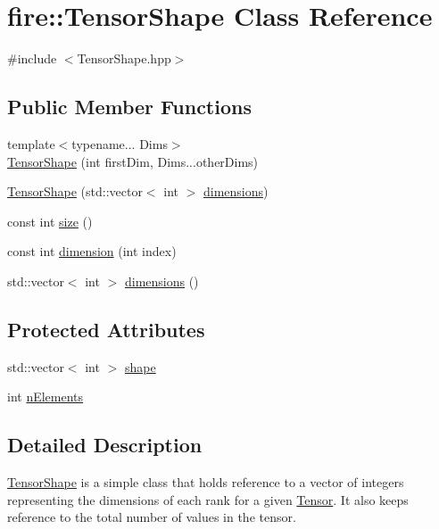 \hypertarget{a00048}{}\section{fire\+:\+:Tensor\+Shape Class Reference}
\label{a00048}


{\ttfamily \#include $<$Tensor\+Shape.\+hpp$>$}

\subsection*{Public Member Functions}
\begin{DoxyCompactItemize}
\item 
{\footnotesize template$<$typename... Dims$>$ }\\\hyperlink{a00048_a899618b4ea57612bd7fa8a7cdf73d66b}{Tensor\+Shape} (int first\+Dim, Dims...\+other\+Dims)
\item 
\hyperlink{a00048_a0c071ec9da07a6f364f063eb8e2c292f}{Tensor\+Shape} (std\+::vector$<$ int $>$ \hyperlink{a00048_aedcad29b08b96c413686f834df1faca9}{dimensions})
\item 
const int \hyperlink{a00048_a75b374e1e1b1a0f266916d8df69e99ec}{size} ()
\item 
const int \hyperlink{a00048_a57244a10aaf5ce7d3d0f2df74cc76929}{dimension} (int index)
\item 
std\+::vector$<$ int $>$ \hyperlink{a00048_aedcad29b08b96c413686f834df1faca9}{dimensions} ()
\end{DoxyCompactItemize}
\subsection*{Protected Attributes}
\begin{DoxyCompactItemize}
\item 
std\+::vector$<$ int $>$ \hyperlink{a00048_a7c75547b5c68e7ba1d1da6f7bba0b258}{shape}
\item 
int \hyperlink{a00048_aacd43176775cdff868dd47f1577b5255}{n\+Elements}
\end{DoxyCompactItemize}


\subsection{Detailed Description}
\hyperlink{a00048}{Tensor\+Shape} is a simple class that holds reference to a vector of integers representing the dimensions of each rank for a given \hyperlink{a00046}{Tensor}. It also keeps reference to the total number of values in the tensor. 


